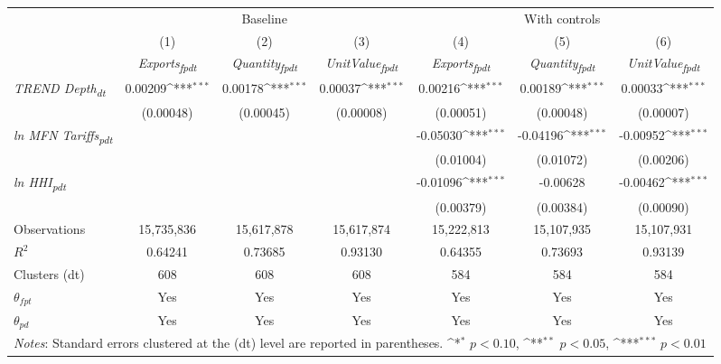 {
\def\sym#1{\ifmmode^{#1}\else\(^{#1}\)\fi}
\begin{tabular}{l*{6}{c}}
\toprule
&\multicolumn{3}{c}{Baseline}&\multicolumn{3}{c}{With controls}\\\cmidrule(lr){2-4}\cmidrule(lr){5-7}
&(1)&(2)&(3)&(4)&(5)&(6)\\
&\textit{Exports\textsubscript{fpdt}}&\textit{Quantity\textsubscript{fpdt}}&\textit{UnitValue\textsubscript{fpdt}}&\textit{Exports\textsubscript{fpdt}}&\textit{Quantity\textsubscript{fpdt}}&\textit{UnitValue\textsubscript{fpdt}}\\
\midrule
\textit{TREND Depth\textsubscript{dt}} & 0.00209\sym{***} & 0.00178\sym{***} & 0.00037\sym{***} & 0.00216\sym{***} & 0.00189\sym{***} & 0.00033\sym{***}\\
 & (0.00048) & (0.00045) & (0.00008) & (0.00051) & (0.00048) & (0.00007)\\
\addlinespace
\textit{ln MFN Tariffs\textsubscript{pdt}} &  &  &  & -0.05030\sym{***} & -0.04196\sym{***} & -0.00952\sym{***}\\
 &  &  &  & (0.01004) & (0.01072) & (0.00206)\\
\addlinespace
\textit{ln HHI\textsubscript{pdt}} &  &  &  & -0.01096\sym{***} & -0.00628 & -0.00462\sym{***}\\
 &  &  &  & (0.00379) & (0.00384) & (0.00090)\\
\midrule
Observations & 15,735,836 & 15,617,878 & 15,617,874 & 15,222,813 & 15,107,935 & 15,107,931\\
$R^{2}$ & 0.64241 & 0.73685 & 0.93130 & 0.64355 & 0.73693 & 0.93139\\
Clusters (dt) & 608 & 608 & 608 & 584 & 584 & 584\\
$\theta_{fpt}$ & Yes & Yes & Yes & Yes & Yes & Yes\\
$\theta_{pd}$ & Yes & Yes & Yes & Yes & Yes & Yes\\
\bottomrule
\multicolumn{7}{l}{\footnotesize \textit{Notes}: Standard errors clustered at the (dt) level are reported in parentheses. \sym{*} \(p<0.10\), \sym{**} \(p<0.05\), \sym{***} \(p<0.01\)}\\
\end{tabular}
}
